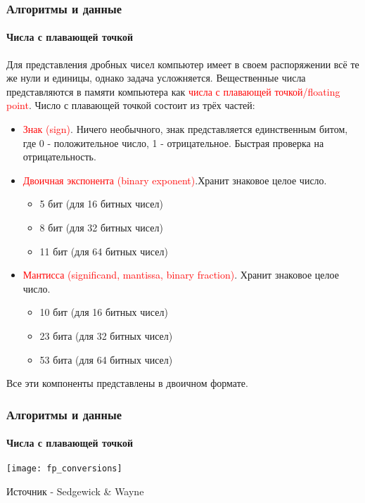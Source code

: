 \documentclass[aspectratio=169]{beamer}
\begin{document}
\begin{frame}
\frametitle{Алгоритмы и данные}
\framesubtitle{Числа с плавающей точкой}
\justifying
\small
Для представления дробных чисел компьютер имеет в своем распоряжении всё те же нули и единицы, однако задача усложняется.
Вещественные числа представляются в памяти компьютера как \textcolor{red}{числа с плавающей точкой/floating point}.\newline
Число с плавающей точкой состоит из трёх частей:
\begin{itemize}
\item{\textcolor{red}{Знак (sign)}. Ничего необычного, знак представляется единственным битом, где 0 - положительное число, 1 - отрицательное. Быстрая проверка на отрицательность.}
\item{\textcolor{red}{Двоичная экспонента (binary exponent)}.Хранит знаковое целое число.}
\begin{itemize}
\item{5 бит (для 16 битных чисел)}
\item{8 бит (для 32 битных чисел)}
\item{11 бит (для 64 битных чисел)}
\end{itemize}
\item{\textcolor{red}{Мантисса (significand, mantissa, binary fraction)}. Хранит знаковое целое число.}
\begin{itemize}
\item{10 бит (для 16 битных чисел)}
\item{23 бита (для 32 битных чисел)}
\item{53 бита (для 64 битных чисел)}
\end{itemize}
\end{itemize}

Все эти компоненты представлены в двоичном формате.
\end{frame}

\begin{frame}
\frametitle{Алгоритмы и данные}
\framesubtitle{Числа с плавающей точкой}
\justifying
\small
\centering
\texttt{[image: fp\_conversions]}

\tiny Источник - Sedgewick \& Wayne 
\end{frame}
\end{document}
